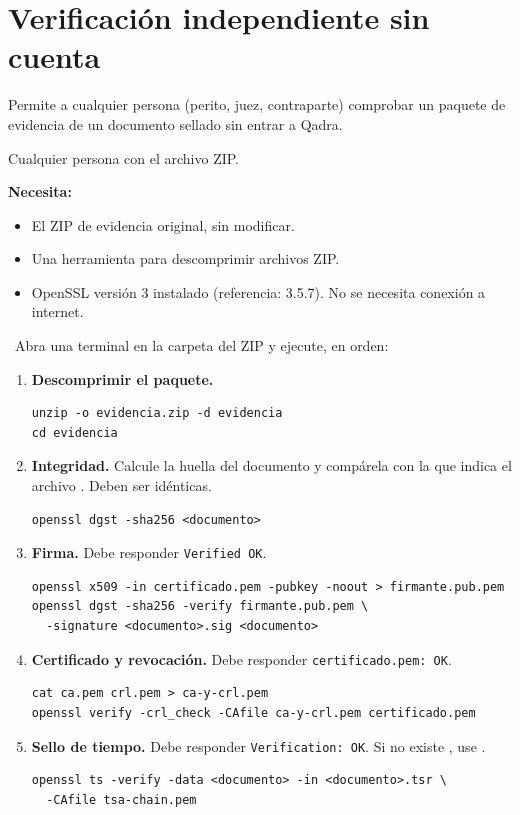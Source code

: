 \chapter{Verificación independiente sin cuenta}\label{cap:verificacion-independiente}

\paraque Permite a cualquier persona (perito, juez, contraparte) comprobar un
paquete de evidencia de un documento sellado sin entrar a Qadra.

\disponible Cualquier persona con el archivo ZIP.

\textbf{Necesita:}
\begin{itemize}
  \item El ZIP de evidencia original, sin modificar.
  \item Una herramienta para descomprimir archivos ZIP.
  \item OpenSSL versión 3 instalado (referencia: 3.5.7). No se necesita
        conexión a internet.
\end{itemize}

\pasos\ Abra una terminal en la carpeta del ZIP y ejecute, en orden:
\begin{enumerate}
  \item \textbf{Descomprimir el paquete.}
\begin{verbatim}
unzip -o evidencia.zip -d evidencia
cd evidencia
\end{verbatim}
  \item \textbf{Integridad.} Calcule la huella del documento y compárela con
        la que indica el archivo . Deben ser
        idénticas.
\begin{verbatim}
openssl dgst -sha256 <documento>
\end{verbatim}
  \item \textbf{Firma.} Debe responder \texttt{Verified OK}.
\begin{verbatim}
openssl x509 -in certificado.pem -pubkey -noout > firmante.pub.pem
openssl dgst -sha256 -verify firmante.pub.pem \
  -signature <documento>.sig <documento>
\end{verbatim}
  \item \textbf{Certificado y revocación.} Debe responder
        \texttt{certificado.pem: OK}.
\begin{verbatim}
cat ca.pem crl.pem > ca-y-crl.pem
openssl verify -crl_check -CAfile ca-y-crl.pem certificado.pem
\end{verbatim}
  \item \textbf{Sello de tiempo.} Debe responder \texttt{Verification: OK}.
        Si no existe \archivo{tsa-chain.pem}, use \archivo{ca.pem}.
\begin{verbatim}
openssl ts -verify -data <documento> -in <documento>.tsr \
  -CAfile tsa-chain.pem
\end{verbatim}
\end{enumerate}

